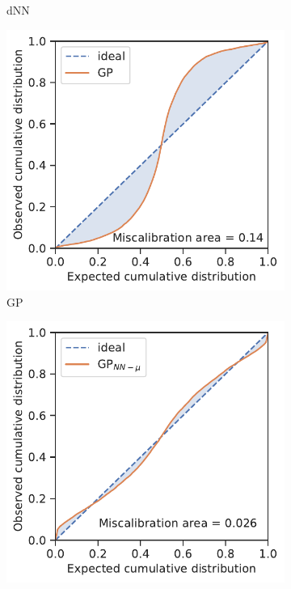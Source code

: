 \documentclass[]{achemso}
\begin{document}
\begin{figure}
\begin{subfigure}{0.32\textwidth}
        \caption{\gls{dNN}}\label{fig:calibration_dnn}
    \end{subfigure}
    \begin{subfigure}{0.32\textwidth}
        \includegraphics[width=\textwidth]{../GP/Matern/calibration.pdf}
        \caption{\gls{GP}}\label{fig:calibration_gp}
    \end{subfigure}
    \begin{subfigure}{0.32\textwidth}
        \includegraphics[width=\textwidth]{../GPnnm/Matern/calibration.pdf}

\end{subfigure}
\end{figure}
\end{document}
